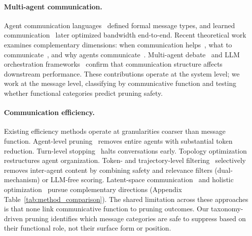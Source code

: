 \paragraph{Multi-agent communication.}
Agent communication languages~\cite{finin_kqml_1994} defined formal message types, and learned communication~\cite{sukhbaatar_commnet_2016, foerster_dial_2016} later optimized bandwidth end-to-end. Recent theoretical work examines complementary dimensions: when communication helps~\cite{rizvi_martel_communication_2026}, what to communicate~\cite{chen_five_ws_2026}, and why agents communicate~\cite{zhou_why_agents_communicate_2025}. Multi-agent debate~\cite{du_debate_2024} and LLM orchestration frameworks~\cite{li_camel_2023, hong_metagpt_2024, wu_autogen_2024, chen_agentverse_2024, wang_megaagent_2025} confirm that communication structure affects downstream performance. These contributions operate at the system level; we work at the message level, classifying by communicative function and testing whether functional categories predict pruning safety.

\paragraph{Communication efficiency.}
Existing efficiency methods operate at granularities coarser than message function. Agent-level pruning~\cite{wang_agentdropout_2025, wang_agentdropout_v2_2026, zhang_agentprune_2025, li_agp_2025, xiao_agentdiet_2026} removes entire agents with substantial token reduction. Turn-level stopping~\cite{zeng_s2mad_2025} halts conversations early. Topology optimization~\cite{chen_optima_2025, chen_goagent_2026, wang_anymac_2025, li_lacp_2025} restructures agent organization. Token- and trajectory-level filtering~\cite{safesieve_2025, lin_supervisoragent_2026} selectively removes inter-agent content by combining safety and relevance filters (dual-mechanism) or LLM-free scoring. Latent-space communication~\cite{zou_latentmas_2025, du_interlat_2025} and holistic optimization~\cite{li_omac_2025, jiang_agentcomm_2026} pursue complementary directions (Appendix Table~\ref{tab:method_comparison}). The shared limitation across these approaches is that none link communicative function to pruning outcomes. Our taxonomy-driven pruning identifies which message categories are safe to suppress based on their functional role, not their surface form or position.

